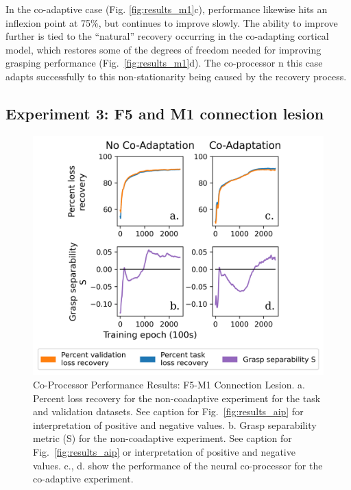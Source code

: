 \documentclass[12pt]{iopart}
\begin{document}

In the co-adaptive case (Fig. \ref{fig:results_m1}c), performance likewise hits an inflexion point at 75\%, but
continues to improve slowly. The ability to improve further is tied to the
``natural'' recovery occurring in the co-adapting cortical model, which restores some of the
degrees of freedom needed for improving grasping performance (Fig.\ \ref{fig:results_m1}d). The co-processor 
n this case adapts successfully to this non-stationarity being caused by the recovery process. 

\subsection{Experiment 3: F5 and M1 connection lesion}
\label{sec:results_con}

\begin{figure}[h]
\centering
\includegraphics[scale=1]{training_results_con.png}
\caption{Co-Processor Performance Results: F5-M1 Connection Lesion. 
          a. Percent loss recovery for the non-coadaptive experiment for the task and validation datasets.
          See caption for Fig.~\ref{fig:results_aip} for interpretation of positive and negative values.
          b. Grasp separability metric (S) for the non-coadaptive experiment. See caption for Fig.~\ref{fig:results_aip} 
          or interpretation of positive and negative values. c., d. show the performance of the neural
          co-processor for the co-adaptive experiment.
         }
\label{fig:results_con}
\end{figure}
\end{document}
